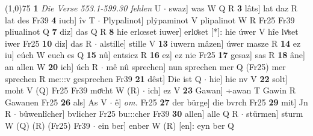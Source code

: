 \documentclass[8pt,a4paper,notitlepage]{article}
\begin{document}
\begin{table}[ht]
\begin{minipage}[t]{0.5\linewidth}
\line(1,0){75} \newline
\textbf{1} \textit{Die Verse 553.1-599.30 fehlen} U   $\cdot$ swaz] was W Q R \textbf{3} lâts] lat daz R lat des Fr39 \textbf{4} iuch] îv T  $\cdot$ Plypalinot] plẏpaminot V plipalinot W R Fr25 Fr39 pliualinot Q \textbf{7} diz] das Q R \textbf{8} hie erlœset iuwer] erloͤset [*]: hie úwer V hîe lvͦset iwer Fr25 \textbf{10} diz] das R  $\cdot$ alstille] stille V \textbf{13} iuwern mâzen] úwer masze R \textbf{14} ez iu] eúch W euch es Q \textbf{15} nû] entsicz R \textbf{16} ez] ez nie Fr25 \textbf{17} gesaz] sas R \textbf{18} âne] an allen W \textbf{20} ich] úch R  $\cdot$ mê nû sprechen] nun sprechen mer Q (Fr25) mer sprechen R me:::v gesprechen Fr39 \textbf{21} dêst] Die ist Q  $\cdot$ hie] hie nv V \textbf{22} solt] moht V (Q) Fr25 Fr39 moͤcht W (R)  $\cdot$ ich] ez V \textbf{23} Gawan] ÷awan T Gawin R Gawanen Fr25 \textbf{26} als] As V  $\cdot$ ê] \textit{om.} Fr25 \textbf{27} der bürge] die bvrch Fr25 \textbf{29} mit] Jn R  $\cdot$ bûwenlîcher] bvlicher Fr25 bu:::cher Fr39 \textbf{30} allen] alle Q R  $\cdot$ stürmen] sturm W (Q) (R) (Fr25) Fr39  $\cdot$ ein ber] enber W (R) [en]: eyn ber Q \newline
\end{minipage}
\end{table}
\end{document}
